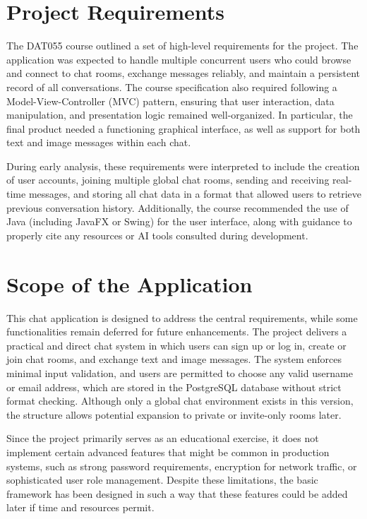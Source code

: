 \documentclass[12pt,a4paper]{report}
\begin{document}
\chapter{Project Requirements}
The DAT055 course outlined a set of high-level requirements for the project.
The application was expected to handle multiple concurrent users who could
browse and connect to chat rooms, exchange messages reliably, and maintain a
persistent record of all conversations. The course specification also required
following a Model-View-Controller (MVC) pattern, ensuring that user
interaction, data manipulation, and presentation logic remained well-organized.
In particular, the final product needed a functioning graphical interface, as
well as support for both text and image messages within each chat.

During early analysis, these requirements were interpreted to include the
creation of user accounts, joining multiple global chat rooms, sending and
receiving real-time messages, and storing all chat data in a format that
allowed users to retrieve previous conversation history. Additionally, the
course recommended the use of Java (including JavaFX or Swing) for the user
interface, along with guidance to properly cite any resources or AI tools
consulted during development.

\chapter{Scope of the Application}
This chat application is designed to address the central requirements, while
some functionalities remain deferred for future enhancements. The project
delivers a practical and direct chat system in which users can sign up or log
in, create or join chat rooms, and exchange text and image messages. The system
enforces minimal input validation, and users are permitted to choose any valid
username or email address, which are stored in the PostgreSQL database without
strict format checking. Although only a global chat environment exists in this
version, the structure allows potential expansion to private or invite-only
rooms later.

Since the project primarily serves as an educational exercise, it does not
implement certain advanced features that might be common in production systems,
such as strong password requirements, encryption for network traffic, or
sophisticated user role management. Despite these limitations, the basic
framework has been designed in such a way that these features could be added
later if time and resources permit.
\end{document}
